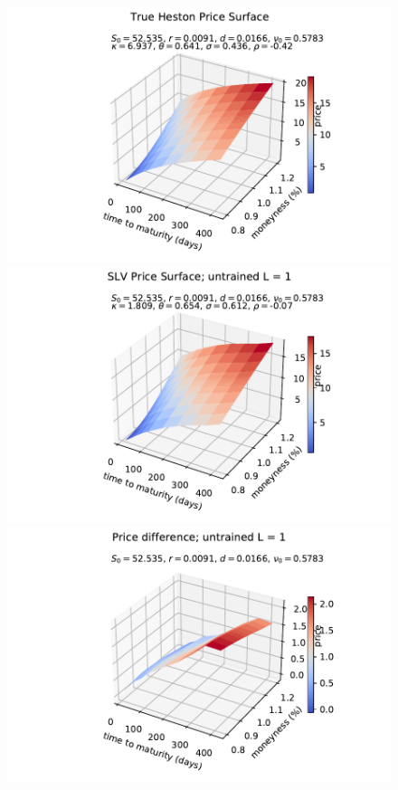\documentclass[
a4paper,     %
12pt           %
]{scrartcl}  %
\numberwithin{equation}{section}
\begin{document}
\begin{figure}
	\begin{minipage}[Ausrichtung]{0.329\textwidth}
		\includegraphics[width=\textwidth]{fig/Psurf_orginal_2017-01-01}
	\end{minipage}
	\begin{minipage}[Ausrichtung]{0.329\textwidth}
		\includegraphics[width=\textwidth]{fig/Psurf_untrained_2017-01-01}
	\end{minipage}
	\begin{minipage}[Ausrichtung]{0.329\textwidth}
		\includegraphics[width=\textwidth]{fig/Psurf_untrained_diff_2017-01-01_rec_3lay_seed1}

\end{minipage}
\end{figure}
\end{document}
